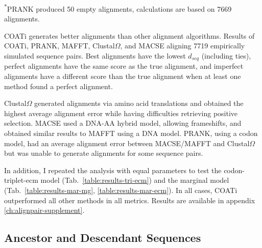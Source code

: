 \begin{table}[!ht]
\centering

 \vspace{1mm}
 \footnotesize{\textsuperscript{*}PRANK produced 50 empty alignments, calculations are based on 7669 alignments.}
 \caption[COATi Benchmark Results]{COATi generates better alignments than other alignment algorithms. Results of COATi, PRANK, MAFFT, Clustal$\Omega$, and MACSE aligning 7719 empirically simulated sequence pairs. Best alignments have the lowest $d_{seq}$ (including ties), perfect alignments have the same score as the true alignment, and imperfect alignments have a different score than the true alignment when at least one method found a perfect alignment.}
 \label{table:comp}
\end{table}


Clustal$\Omega$ generated alignments via amino acid translations and obtained the highest average alignment error while having difficulties retrieving positive selection.
MACSE used a DNA-AA hybrid model, allowing frameshifts, and obtained similar results to MAFFT using a DNA model.
PRANK, using a codon model, had an average alignment error between MACSE/MAFFT and Clustal$\Omega$ but was unable to generate alignments for some sequence pairs.



In addition, I repeated the analysis with equal parameters to test the codon-triplet-ecm model (Tab.~\ref{table:results-tri-ecm}) and the marginal model (Tab.~\ref{table:results-mar-mg}, \ref{table:results-mar-ecm}). In all cases, COATi outperformed all other methods in all metrics. Results are available in appendix \ref{ch:alignpair-supplement}.

\subsection{Ancestor and Descendant Sequences}

